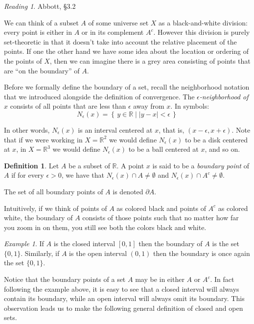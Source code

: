 \documentclass[11pt,oneside]{amsbook}
\newcommand{\set}[1]{\left\{\,#1\,\right\}}
\newcommand{\R}{\mathbb R}
\theoremstyle{definition}
\theoremstyle{plain}
\theoremstyle{definition}
\newtheorem{definition}[theorem]{Definition}
\theoremstyle{remark}
\newtheorem{example}[theorem]{Example}
\newtheorem*{reading}{Reading}
\numberwithin{equation}{section}
\numberwithin{figure}{section}
\begin{document}
\begin{reading}
  Abbott, \S 3.2
\end{reading}

We can think of a subset $A$ of some universe set $X$ as a black-and-white division: every point is either in $A$ or in its complement $A^c$. However this division is purely set-theoretic in that it doesn't take into account the relative placement of the points. If one the other hand we have some idea about the location or ordering of the points of $X$, then we can imagine there is a grey area consisting of points that are ``on the boundary'' of $A$.

Before we formally define the boundary of a set, recall the neighborhood notation that we introduced alongside the definition of convergence. The \emph{$\epsilon$-neighborhood of $x$} consists of all points that are less than $\epsilon$ away from $x$. In symbols:
\[N_\epsilon(x)=\set{y\in\R\mid|y-x|<\epsilon}
\]

In other words, $N_\epsilon(x)$ is an interval centered at $x$, that is, $(x-\epsilon,x+\epsilon)$. Note that if we were working in $X=\R^2$ we would define $N_\epsilon(x)$ to be a disk centered at $x$, in $X=\R^3$ we would define $N_\epsilon(x)$ to be a ball centered at $x$, and so on.

\begin{definition}
  Let $A$ be a subset of $\R$. A point $x$ is said to be a \emph{boundary point} of $A$ if for every $\epsilon>0$, we have that $N_\epsilon(x)\cap A\neq\emptyset$ and $N_\epsilon(x)\cap A^c\neq\emptyset$.
  
  The set of all boundary points of $A$ is denoted $\partial A$.
\end{definition}

Intuitively, if we think of points of $A$ as colored black and points of $A^c$ as colored white, the boundary of $A$ consists of those points such that no matter how far you zoom in on them, you still see both the colors black and white.

\begin{example}
  If $A$ is the closed interval $[0,1]$ then the boundary of $A$ is the set $\{0,1\}$. Similarly, if $A$ is the open interval $(0,1)$ then the boundary is once again the set $\{0,1\}$.
\end{example}

Notice that the boundary points of a set $A$ may be in either $A$ or $A^c$. In fact following the example above, it is easy to see that a closed interval will always contain its boundary, while an open interval will always omit its boundary. This observation leads us to make the following general definition of closed and open sets.
\end{document}
